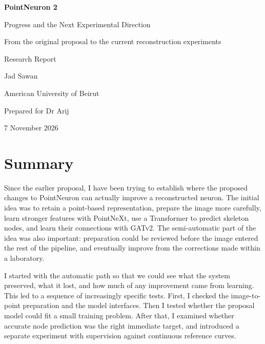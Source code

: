 \documentclass[11pt,a4paper]{article}
\begin{document}
\hypersetup{pageanchor=false}
\begin{titlepage}
\centering
\vspace*{29mm}
{\LARGE\bfseries PointNeuron 2\par}
\vspace{6mm}
{\Large Progress and the Next Experimental Direction\par}
\vspace{10mm}
{\large From the original proposal to the current reconstruction experiments\par}
\vspace{25mm}
{\large Research Report\par}
\vspace{15mm}
{\large Jad Sawan\par}
\vspace{5mm}
{\large American University of Beirut\par}
\vfill
{\large Prepared for Dr Arij\par}
\vspace{8mm}
{\large 7 November 2026\par}
\vspace*{18mm}
\end{titlepage}
\hypersetup{pageanchor=true}

\section*{Summary}
Since the earlier proposal, I have been trying to establish where the proposed changes to PointNeuron can actually improve a reconstructed neuron. The initial idea was to retain a point-based representation, prepare the image more carefully, learn stronger features with PointNeXt, use a Transformer to predict skeleton nodes, and learn their connections with GATv2. The semi-automatic part of the idea was also important: preparation could be reviewed before the image entered the rest of the pipeline, and eventually improve from the corrections made within a laboratory.

I started with the automatic path so that we could see what the system preserved, what it lost, and how much of any improvement came from learning. This led to a sequence of increasingly specific tests. First, I checked the image-to-point preparation and the model interfaces. Then I tested whether the proposal model could fit a small training problem. After that, I examined whether accurate node prediction was the right immediate target, and introduced a separate experiment with supervision against continuous reference curves.
\end{document}
